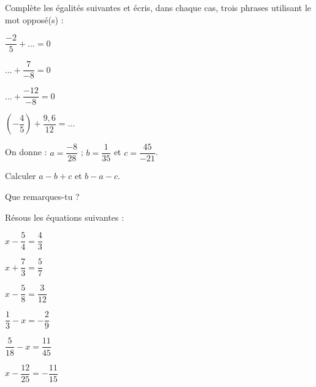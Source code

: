 \begin{exercice}[Opposés] 
Complète les égalités suivantes et écris, dans chaque cas, trois phrases utilisant le mot \og opposé(s) \fg :

\begin{colenumerate}{2} 
\item $\dfrac{-2}{5} + ... =0$
\item $... + \dfrac{7}{-8} = 0$
\item $... + \dfrac{-12}{-8} = 0$
\item $\left(-\dfrac{4}{5}\right) + \dfrac{9,6}{12} = ...$
\end{colenumerate} 
\end{exercice}



\begin{exercice}
On donne : $a = \dfrac{-8}{28}$ ; $b = \dfrac{1}{35}$ et $c = \dfrac{45}{-21}$.

\begin{colenumerate}{1} 
\item Calculer $a - b + c$ et $b - a - c$.
\item Que remarques-tu ?
\end{colenumerate} 
\end{exercice}









\begin{exercice}

Résous les équations suivantes :

\begin{colenumerate}{2} 
\item $x - \dfrac{5}{4} = \dfrac{4}{3}$
\item $x + \dfrac{7}{3} = \dfrac{5}{7}$
\item $x - \dfrac{5}{8} = \dfrac{3}{12}$
\item $\dfrac{1}{3} - x = -\dfrac{2}{9}$
\item $\dfrac{5}{18} - x = \dfrac{11}{45}$
\item $x - \dfrac{12}{25} = -\dfrac{11}{15}$
\end{colenumerate} 
\end{exercice}

